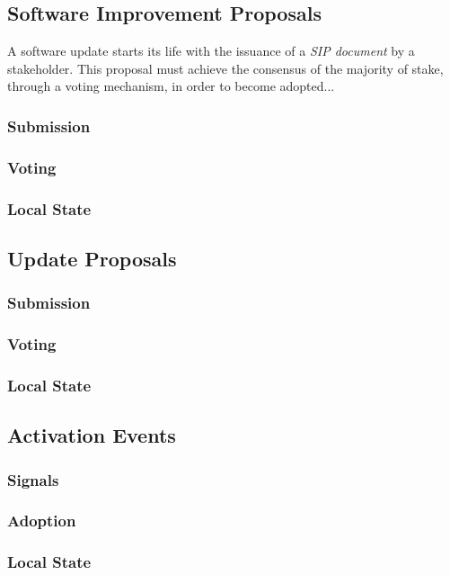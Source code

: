 
\subsection{Software Improvement Proposals}
   A software update starts its life with the issuance of a \emph{SIP document} by a stakeholder. This proposal must achieve the consensus of the majority of stake, through a voting mechanism, in order to become adopted... 
\subsubsection{Submission}
\subsubsection{Voting}
\subsubsection{Local State}

\subsection{Update Proposals}
\subsubsection{Submission}
\subsubsection{Voting}
\subsubsection{Local State}

\subsection{Activation Events}
\subsubsection{Signals}
\subsubsection{Adoption}
\subsubsection{Local State}

